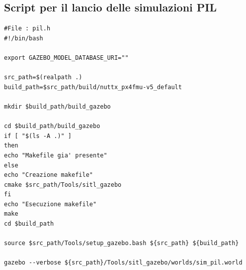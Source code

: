 \subsection{Script per il lancio delle simulazioni PIL}
\lstset{language=bash}
\begin{lstlisting}
#File : pil.h
#!/bin/bash

export GAZEBO_MODEL_DATABASE_URI=""

src_path=$(realpath .)
build_path=$src_path/build/nuttx_px4fmu-v5_default

mkdir $build_path/build_gazebo

cd $build_path/build_gazebo
if [ "$(ls -A .)" ]
then
echo "Makefile gia' presente"
else
echo "Creazione makefile"
cmake $src_path/Tools/sitl_gazebo
fi
echo "Esecuzione makefile"
make
cd $build_path

source $src_path/Tools/setup_gazebo.bash ${src_path} ${build_path}

gazebo --verbose ${src_path}/Tools/sitl_gazebo/worlds/sim_pil.world
\end{lstlisting}

